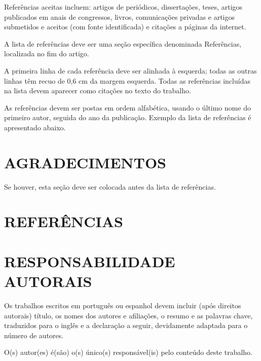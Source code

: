 \documentclass[10pt,fleqn,a4paper]{article}
\begin{document}
        Referências aceitas incluem: artigos de periódicos, dissertações, teses, artigos publicados em anais de congressos, livros, comunicações privadas e artigos submetidos e aceitos (com fonte identificada) e citações a páginas da internet.

        A lista de referências deve ser uma seção específica denominada Referências, localizada no fim do artigo.

        A primeira linha de cada referência deve ser alinhada à esquerda; todas as outras linhas têm recuo de 0,6 cm da margem esquerda. Todas as referências incluídas na lista devem aparecer como citações no texto do trabalho.

        As referências devem ser postas em ordem alfabética, usando o último nome do primeiro autor, seguida do ano da publicação. Exemplo da lista de referências é apresentado abaixo.


    \section{AGRADECIMENTOS}
    
        Se houver, esta seção deve ser colocada antes da lista de referências.


    \section{REFERÊNCIAS}
        
        

    \section{RESPONSABILIDADE AUTORAIS}

        Os trabalhos escritos em português ou espanhol devem incluir (após direitos autorais) título, os nomes dos autores e afiliações, o resumo e as palavras chave, traduzidos para o inglês e a declaração a seguir, devidamente adaptada para o número de autores.
    
        O(s) autor(es) é(são) o(s) único(s) responsável(is) pelo conteúdo deste trabalho.
\end{document}
